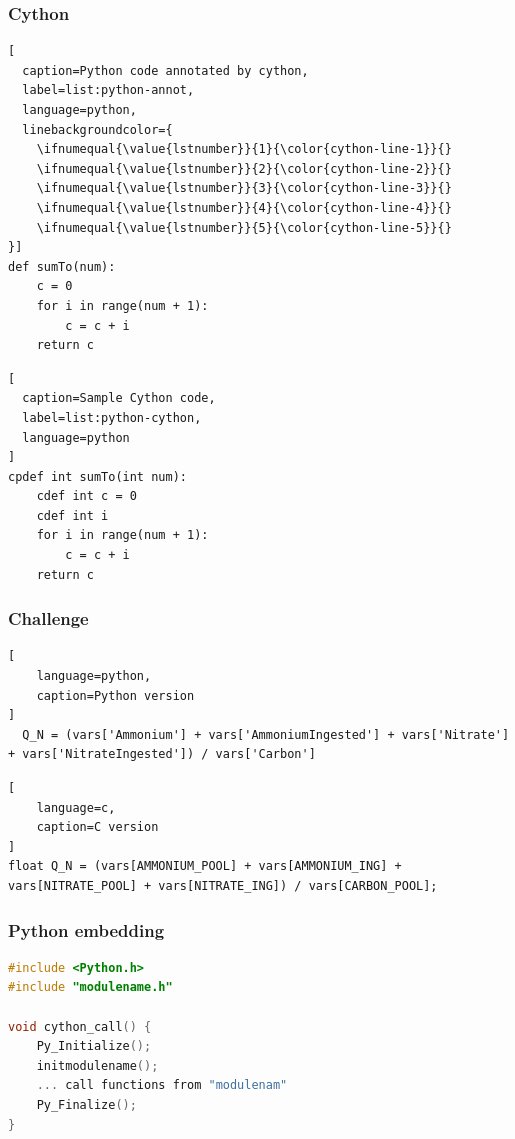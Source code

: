 \documentclass[t]{beamer}
\begin{document}
\begin{frame}[fragile,t]
\frametitle{\huge Cython}
\noindent\begin{minipage}{.45\textwidth}
\begin{lstlisting}[
  caption=Python code annotated by cython,
  label=list:python-annot,
  language=python,
  linebackgroundcolor={
    \ifnumequal{\value{lstnumber}}{1}{\color{cython-line-1}}{}
    \ifnumequal{\value{lstnumber}}{2}{\color{cython-line-2}}{}
    \ifnumequal{\value{lstnumber}}{3}{\color{cython-line-3}}{}
    \ifnumequal{\value{lstnumber}}{4}{\color{cython-line-4}}{}
    \ifnumequal{\value{lstnumber}}{5}{\color{cython-line-5}}{}
}]
def sumTo(num):
    c = 0
    for i in range(num + 1):
        c = c + i
    return c

\end{lstlisting}
\end{minipage}\hfill
\begin{minipage}{.45\textwidth}
\begin{lstlisting}[
  caption=Sample Cython code,
  label=list:python-cython,
  language=python
]
cpdef int sumTo(int num):
    cdef int c = 0
    cdef int i
    for i in range(num + 1):
        c = c + i
    return c
\end{lstlisting}
\end{minipage}
\end{frame}


\begin{frame}[fragile,c]
\frametitle{\huge Challenge}
\begin{lstlisting}[
	language=python,
	caption=Python version
]
  Q_N = (vars['Ammonium'] + vars['AmmoniumIngested'] + vars['Nitrate'] + vars['NitrateIngested']) / vars['Carbon']
\end{lstlisting}

\begin{lstlisting}[
	language=c,
	caption=C version
]
float Q_N = (vars[AMMONIUM_POOL] + vars[AMMONIUM_ING] + vars[NITRATE_POOL] + vars[NITRATE_ING]) / vars[CARBON_POOL];
\end{lstlisting}

\end{frame}


\begin{frame}[fragile,c]

\frametitle{\huge Python embedding}
\begin{lstlisting}[language=c]
#include <Python.h>
#include "modulename.h"

void cython_call() {
    Py_Initialize();
    initmodulename();
    ... call functions from "modulenam"
    Py_Finalize();
}
\end{lstlisting}

\end{frame}
\end{document}
